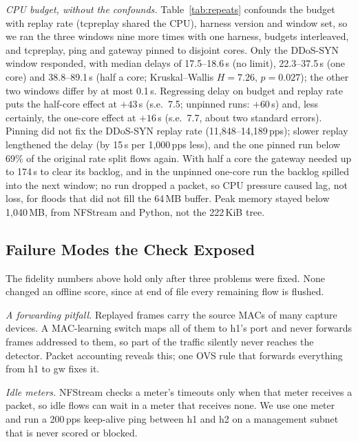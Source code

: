 \emph{CPU budget, without the confounds.} Table~\ref{tab:repeats} confounds the budget with replay rate (tcpreplay shared the CPU), harness version and window set, so we ran the three windows nine more times with one harness, budgets interleaved, and tcpreplay, ping and gateway pinned to disjoint cores. Only the DDoS-SYN window responded, with median delays of 17.5--18.6\,s (no limit), 22.3--37.5\,s (one core) and 38.8--89.1\,s (half a core; Kruskal--Wallis $H=7.26$, $p=0.027$); the other two windows differ by at most 0.1\,s. Regressing delay on budget and replay rate puts the half-core effect at $+43$\,s (s.e.\ 7.5; unpinned runs: $+60$\,s) and, less certainly, the one-core effect at $+16$\,s (s.e.\ 7.7, about two standard errors). Pinning did not fix the DDoS-SYN replay rate (11,848--14,189\,pps); slower replay lengthened the delay (by 15\,s per 1,000\,pps less), and the one pinned run below 69\% of the original rate split flows again. With half a core the gateway needed up to 174\,s to clear its backlog, and in the unpinned one-core run the backlog spilled into the next window; no run dropped a packet, so CPU pressure caused lag, not loss, for floods that did not fill the 64\,MB buffer. Peak memory stayed below 1,040\,MB, from NFStream and Python, not the 222\,KiB tree.

\subsection{Failure Modes the Check Exposed}\label{sec:defect}

The fidelity numbers above hold only after three problems were fixed. None changed an offline score, since at end of file every remaining flow is flushed.

\emph{A forwarding pitfall.} Replayed frames carry the source MACs of many capture devices. A MAC-learning switch maps all of them to h1's port and never forwards frames addressed to them, so part of the traffic silently never reaches the detector. Packet accounting reveals this; one OVS rule that forwards everything from h1 to gw fixes it.

\emph{Idle meters.} NFStream checks a meter's timeouts only when that meter receives a packet, so idle flows can wait in a meter that receives none. We use one meter and run a 200\,pps keep-alive ping between h1 and h2 on a management subnet that is never scored or blocked.

